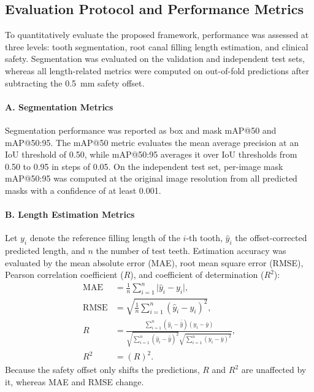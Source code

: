 \subsection{Evaluation Protocol and Performance Metrics}

To quantitatively evaluate the proposed framework, performance was assessed at
three levels: tooth segmentation, root canal filling length estimation, and
clinical safety. Segmentation was evaluated on the validation and independent
test sets, whereas all length-related metrics were computed on out-of-fold
predictions after subtracting the 0.5~mm safety offset.

\paragraph{A. Segmentation Metrics}
Segmentation performance was reported as box and mask mAP@50 and mAP@50:95.
The mAP@50 metric evaluates the mean average precision at an IoU threshold of
0.50, while mAP@50:95 averages it over IoU thresholds from 0.50 to 0.95 in
steps of 0.05. On the independent test set, per-image mask mAP@50:95 was
computed at the original image resolution from all predicted masks with a
confidence of at least 0.001.

\paragraph{B. Length Estimation Metrics}
Let $y_i$ denote the reference filling length of the $i$-th tooth, $\hat{y}_i$
the offset-corrected predicted length, and $n$ the number of test teeth.
Estimation accuracy was evaluated by the mean absolute error (MAE), root mean
square error (RMSE), Pearson correlation coefficient ($R$), and coefficient of
determination ($R^2$):
\begin{align}
\mathrm{MAE}  &= \frac{1}{n}\sum_{i=1}^{n}\lvert \hat{y}_i - y_i \rvert, \\
\mathrm{RMSE} &= \sqrt{\frac{1}{n}\sum_{i=1}^{n}(\hat{y}_i - y_i)^2}, \\
R &= \frac{\sum_{i=1}^{n}(\hat{y}_i-\bar{\hat{y}})(y_i-\bar{y})}
         {\sqrt{\sum_{i=1}^{n}(\hat{y}_i-\bar{\hat{y}})^2}\sqrt{\sum_{i=1}^{n}(y_i-\bar{y})^2}}, \\
R^2 &= (R)^2 .
\end{align}
Because the safety offset only shifts the predictions, $R$ and $R^2$ are
unaffected by it, whereas MAE and RMSE change.

